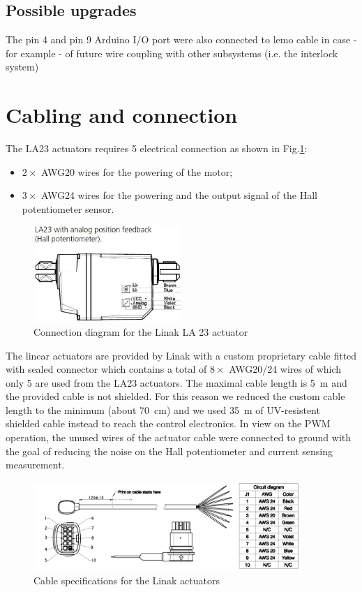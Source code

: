 \documentclass[12pt,a4,twoside]{article}
\begin{document}
\subsection{Possible upgrades}
The pin 4 and pin 9 Arduino I/O port were also connected to lemo cable in case - for example - of future wire coupling with other subsystems (i.e. the interlock system)
\clearpage
\section{Cabling and connection}
The LA23 actuators requires 5 electrical connection as shown in Fig.\ref{figLA23connector}:
\begin{itemize}
\item$2\times$ AWG20 wires for the powering of the motor;
\item$3\times$ AWG24 wires for the powering and the output signal of the Hall potentiometer sensor.
\end{itemize}
\begin{figure}[h!]
\centering
\includegraphics[width=0.5\textwidth]{LA23_connector.jpg}
\caption{\label{figLA23connector} {Connection diagram for the Linak LA 23 actuator}}
\end{figure}

The linear actuators are provided by Linak with a custom proprietary cable fitted with sealed connector which contains a total of $8\times$ AWG20/24 wires of which only 5 are used from the LA23 actuators. The maximal cable length is 5~m and the provided cable is not shielded. For this reason we reduced the custom cable length to the minimum (about 70~cm) and we used 35~m of UV-resistent shielded cable instead to reach the control electronics.
In view on the PWM operation, the unused wires of the actuator cable were connected to ground with the goal of reducing the noise on the Hall potentiometer and current sensing measurement.
\begin{figure}[h!]
\centering
\includegraphics[width=0.9\textwidth]{LA23_cable.pdf}
\caption{\label{figLA23cable} {Cable specifications for the Linak actuators}}
\end{figure}
\end{document}
